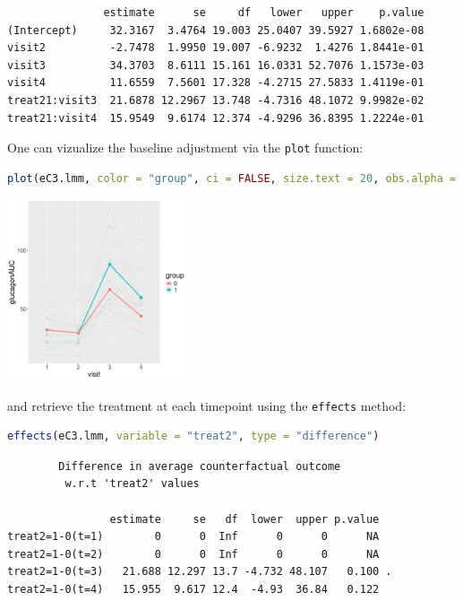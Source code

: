 \documentclass[12pt]{article}
\begin{document}
\label{}
\begin{verbatim}
               estimate      se     df   lower   upper    p.value
(Intercept)     32.3167  3.4764 19.003 25.0407 39.5927 1.6802e-08
visit2          -2.7478  1.9950 19.007 -6.9232  1.4276 1.8441e-01
visit3          34.3703  8.6111 15.161 16.0331 52.7076 1.1573e-03
visit4          11.6559  7.5601 17.328 -4.2715 27.5833 1.4119e-01
treat21:visit3  21.6878 12.2967 13.748 -4.7316 48.1072 9.9982e-02
treat21:visit4  15.9549  9.6174 12.374 -4.9296 36.8395 1.2224e-01
\end{verbatim}


One can vizualize the baseline adjustment via the \texttt{plot} function:
\begin{lstlisting}[language=r,numbers=none]
plot(eC3.lmm, color = "group", ci = FALSE, size.text = 20, obs.alpha = 0.1)
\end{lstlisting}

\begin{center}
\includegraphics[width=0.4\textwidth]{./figures/gg-baseAdj.pdf}
\end{center}

and retrieve the treatment at each timepoint using the \texttt{effects} method:
\begin{lstlisting}[language=r,numbers=none]
effects(eC3.lmm, variable = "treat2", type = "difference")
\end{lstlisting}

\label{}
\begin{verbatim}
		Difference in average counterfactual outcome
		 w.r.t 'treat2' values 

                estimate     se   df  lower  upper p.value  
treat2=1-0(t=1)        0      0  Inf      0      0      NA  
treat2=1-0(t=2)        0      0  Inf      0      0      NA  
treat2=1-0(t=3)   21.688 12.297 13.7 -4.732 48.107   0.100 .
treat2=1-0(t=4)   15.955  9.617 12.4  -4.93  36.84   0.122
\end{verbatim}
\end{document}
